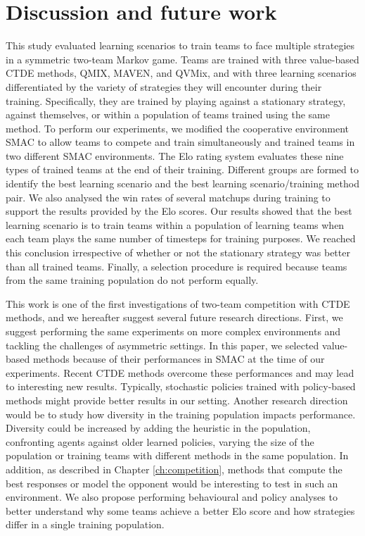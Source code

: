 \section{Discussion and future work} \label{sec:ch7_conclu}
This study evaluated learning scenarios to train teams to face multiple strategies in a symmetric two-team Markov game.
Teams are trained with three value-based CTDE methods, QMIX, MAVEN, and QVMix, and with three learning scenarios differentiated by the variety of strategies they will encounter during their training.
Specifically, they are trained by playing against a stationary strategy, against themselves, or within a population of teams trained using the same method.
To perform our experiments, we modified the cooperative environment SMAC to allow teams to compete and train simultaneously and trained teams in two different SMAC environments.
The Elo rating system evaluates these nine types of trained teams at the end of their training.
Different groups are formed to identify the best learning scenario and the best learning scenario/training method pair.
We also analysed the win rates of several matchups during training to support the results provided by the Elo scores.
Our results showed that the best learning scenario is to train teams within a population of learning teams when each team plays the same number of timesteps for training purposes.
We reached this conclusion irrespective of whether or not the stationary strategy was better than all trained teams.
Finally, a selection procedure is required because teams from the same training population do not perform equally.

This work is one of the first investigations of two-team competition with CTDE methods, and we hereafter suggest several future research directions.
First, we suggest performing the same experiments on more complex environments and tackling the challenges of asymmetric settings.
In this paper, we selected value-based methods because of their performances in SMAC \citep{samvelyan2019starcraft} at the time of our experiments.
Recent CTDE methods overcome these performances and may lead to interesting new results.
Typically, stochastic policies trained with policy-based methods might provide better results in our setting.
Another research direction would be to study how diversity in the training population impacts performance. 
Diversity could be increased by adding the heuristic in the population, confronting agents against older learned policies, varying the size of the population or training teams with different methods in the same population.
In addition, as described in Chapter \ref{ch:competition}, methods that compute the best responses or model the opponent would be interesting to test in such an environment.
We also propose performing behavioural and policy analyses to better understand why some teams achieve a better Elo score and how strategies differ in a single training population.